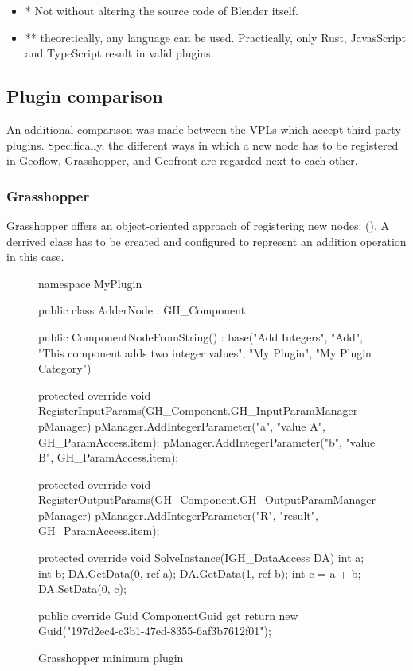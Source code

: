 \begin{itemize}[ ]
  \item * Not without altering the source code of Blender itself.
  \item ** theoretically, any language can  be used. 
  Practically, only Rust, JavasScript and TypeScript result in valid plugins. 
\end{itemize}

\subsection{Plugin comparison}

An additional comparison was made between the VPLs which accept third party plugins.
Specifically, the different ways in which a new node has to be registered in Geoflow, Grasshopper, and Geofront are regarded next to each other.

\subsubsection{Grasshopper}

Grasshopper offers an object-oriented approach of registering new nodes: ().
A derrived class has to be created and configured to represent an addition operation in this case.

\begin{figure}
\centering
\begin{code}
namespace MyPlugin
{
    public class AdderNode : GH_Component
    {
        public ComponentNodeFromString()
          : base("Add Integers",
            "Add",
            "This component adds two integer values",
            "My Plugin",
            "My Plugin Category")
        {
        }

        protected override void RegisterInputParams(GH_Component.GH_InputParamManager pManager)
        {
            pManager.AddIntegerParameter("a", "value A", GH_ParamAccess.item);
            pManager.AddIntegerParameter("b", "value B", GH_ParamAccess.item);
        }

        protected override void RegisterOutputParams(GH_Component.GH_OutputParamManager pManager)
        {
            pManager.AddIntegerParameter("R", "result", GH_ParamAccess.item);
        }

        protected override void SolveInstance(IGH_DataAccess DA)
        {
            int a;
            int b;
            DA.GetData(0, ref a);
            DA.GetData(1, ref b);
            int c = a + b;
            DA.SetData(0, c);
        }

        public override Guid ComponentGuid
        {
            get { return new Guid("197d2ec4-c3b1-47ed-8355-6af3b7612f01"); }
        }
    }
}
\end{code}
\caption[]{Grasshopper minimum plugin}
\label{fig:boilerplate:grasshopper}
\end{figure}


